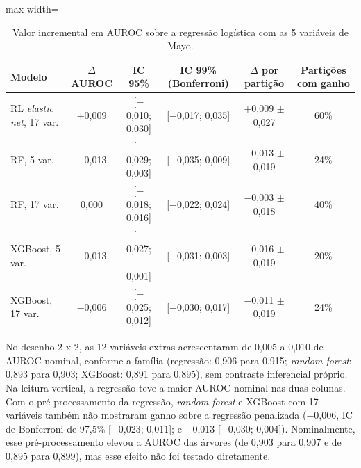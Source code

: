 \begin{table}[htbp]
\centering
\caption{Valor incremental em AUROC sobre a regressão logística com as 5 variáveis de Mayo.}
\label{tab:incremental}
\footnotesize
\renewcommand{\arraystretch}{1.16}
\setlength{\tabcolsep}{4pt}
\begin{adjustbox}{max width=\linewidth}
\begin{tabular}{@{}lccccc@{}}
\toprule
\textbf{Modelo} & \textbf{$\Delta$AUROC} & \textbf{IC 95\%} & \textbf{IC 99\% (Bonferroni)} & \textbf{$\Delta$ por partição} & \textbf{Partições com ganho} \\
\midrule
RL \textit{elastic net}, 17 var. & +0,009 & [$-$0,010; 0,030] & [$-$0,017; 0,035] & +0,009 $\pm$ 0,027 & 60\% \\
RF, 5 var. & $-$0,013 & [$-$0,029; 0,003] & [$-$0,035; 0,009] & $-$0,013 $\pm$ 0,019 & 24\% \\
RF, 17 var. & 0,000 & [$-$0,018; 0,016] & [$-$0,022; 0,024] & $-$0,003 $\pm$ 0,018 & 40\% \\
XGBoost, 5 var. & $-$0,013 & [$-$0,027; $-$0,001] & [$-$0,031; 0,003] & $-$0,016 $\pm$ 0,019 & 20\% \\
XGBoost, 17 var. & $-$0,006 & [$-$0,025; 0,012] & [$-$0,030; 0,017] & $-$0,011 $\pm$ 0,019 & 24\% \\
\bottomrule
\end{tabular}
\end{adjustbox}
\par{}
\end{table}

No desenho 2 x 2, as 12 variáveis extras acrescentaram de 0,005 a 0,010 de AUROC nominal, conforme a família (regressão: 0,906 para 0,915; \textit{random forest}: 0,893 para 0,903; XGBoost: 0,891 para 0,895), sem contraste inferencial próprio. Na leitura vertical, a regressão teve a maior AUROC nominal nas duas colunas. Com o pré-processamento da regressão, \textit{random forest} e XGBoost com 17 variáveis também não mostraram ganho sobre a regressão penalizada ($-$0,006, IC de Bonferroni de 97,5\% [$-$0,023; 0,011]; e $-$0,013 [$-$0,030; 0,004]). Nominalmente, esse pré-processamento elevou a AUROC das árvores (de 0,903 para 0,907 e de 0,895 para 0,899), mas esse efeito não foi testado diretamente.

